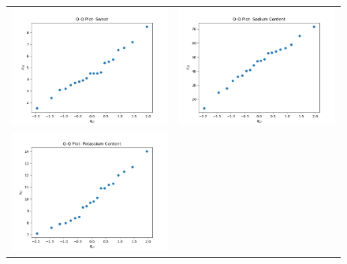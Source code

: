 \begin{enumerate}[label=(\alph*)]
    \begin{figure}[H]
        \centering
        \begin{tabular}{cc}
            \includegraphics[scale=0.325]{./python/chapter-5/Question-5-4-QQ-Sweat.png} &
            \includegraphics[scale=0.325]{./python/chapter-5/Question-5-4-QQ-Sodium.png} \\
            \includegraphics[scale=0.325]{./python/chapter-5/Question-5-4-QQ-Potassium.png}

\end{tabular}
\end{figure}
\end{enumerate}

